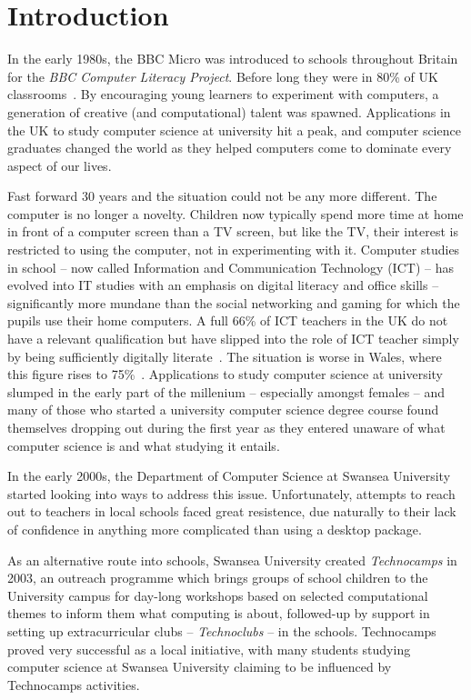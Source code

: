 \documentclass{sig-alternate}
\begin{document}
\section{Introduction}
In the early 1980s, the BBC Micro was introduced to schools throughout
Britain for the \emph{BBC Computer Literacy Project}.
Before long they were in 80\% of UK classrooms~\cite{vasko:1986}.
By encouraging young learners to experiment with computers, a generation
of creative (and computational) talent was spawned. Applications in
the UK to study computer science at university hit a peak, and
computer science graduates changed the world as they helped computers
come to dominate every aspect of our lives.

Fast forward 30 years and the situation could not be any more
different. The computer is no longer a novelty. Children now typically
spend more time at home in front of a computer screen than a TV screen, but
like the TV, their interest is restricted to using the computer, not
in experimenting with it. Computer studies in school -- now called
Information and Communication Technology (ICT) -- has evolved into IT
studies with an emphasis on digital literacy and office skills --
significantly more mundane than the social networking and gaming for
which the pupils use their home computers. A full 66\% of ICT teachers
in the UK do not have a relevant qualification but have slipped into
the role of ICT teacher simply by being sufficiently digitally
literate~\cite{RoyalSoc:2012}.
The situation is worse in Wales, where this figure rises to
75\%~\cite{GTCW:2008}.
Applications to
study computer science at university slumped in the early part of the
millenium -- especially amongst females -- and
many of those who started a university computer science degree course
found themselves dropping out during the first year as they entered
unaware of what computer science is and what studying it entails.

In the early 2000s, the Department of Computer Science at Swansea University
started looking into ways to address this issue.
Unfortunately, attempts to reach out to teachers in local schools
faced great resistence, due naturally to their lack of confidence
in anything more complicated than using a desktop package.

As an alternative route into schools, Swansea University created
\emph{Technocamps} in 2003, an outreach programme which brings groups
of school children to the University campus for day-long workshops based on
selected computational themes to inform them what computing is about,
followed-up by support in setting up
extracurricular clubs -- \emph{Technoclubs} -- in the schools.
Technocamps proved very successful as a local initiative, with many
students studying computer science at Swansea University claiming to be
influenced by Technocamps activities.
\end{document}
